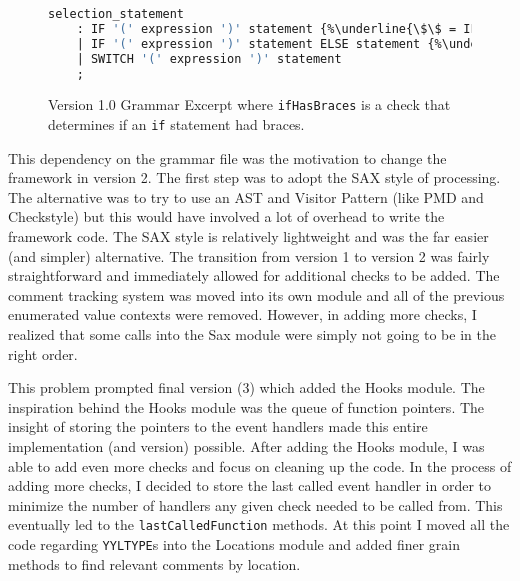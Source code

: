 \documentclass[12pt]{report}
\begin{document}
\begin{figure}
\begin{lstlisting}[language=Caml, escapechar=\%]
selection_statement
	: IF '(' expression ')' statement {%\underline{\$\$ = IF\_SELECTION;}% ifHasBraces($5, @$);}
	| IF '(' expression ')' statement ELSE statement {%\underline{\$\$ = IF\_ELSE\_SELECTION;}% ifHasBraces($5, @$); ifHasBraces($7, @$);}
	| SWITCH '(' expression ')' statement
	;
\end{lstlisting}
\caption[Version 1.0 Grammar Excerpt]{Version 1.0 Grammar Excerpt where \lstinline{ifHasBraces} is a check that determines if an \lstinline{if} statement had braces.}
\label{1.0grammar}
\end{figure}

This dependency on the grammar file was the motivation to change the framework in version 2. The first 
step was to adopt the SAX style of processing. The alternative was to try to use an AST and Visitor 
Pattern (like PMD and Checkstyle) but this would have involved a lot of overhead to write the framework 
code. The SAX style is relatively lightweight and was the far easier (and simpler) alternative. The 
transition from version 1 to version 2 was fairly straightforward and immediately allowed for additional 
checks to be added. The comment tracking system was moved into its own module and all of the 
previous enumerated value contexts were removed. However, in adding more checks, I realized that 
some calls into the Sax module were simply not going to be in the right order. 

This problem prompted final version (3) which added the Hooks module. The inspiration behind the 
Hooks module was the queue of function pointers. The insight of storing the pointers to the event 
handlers made this entire implementation (and version) possible. After adding the Hooks module, I was 
able to add even more checks and focus on cleaning up the code. In the process of adding more checks, 
I decided to store the last called event handler in order to minimize the number of handlers any given 
check needed to be called from. This eventually led to the \lstinline{lastCalledFunction} methods.  At 
this point I moved all the code regarding \lstinline{YYLTYPE}s into the Locations module and added finer 
grain methods to find relevant comments by location. 

\singlespacing
\nocite{*}

\clearpage
{}
{}

\end{document}

